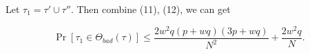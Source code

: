 
%
%

Let $\tau_{1} = \tau' \cup \tau''$. Then combine (11), (12), we can get

\begin{equation}
\operatorname{Pr}[\tau_{1} \in \Theta_{bad}(\tau)] \leq \frac{2w^2 q (p+w q) (3 p +w q)}{N^{2}} + \frac{2w^{2} q}{N}.
\end{equation}





